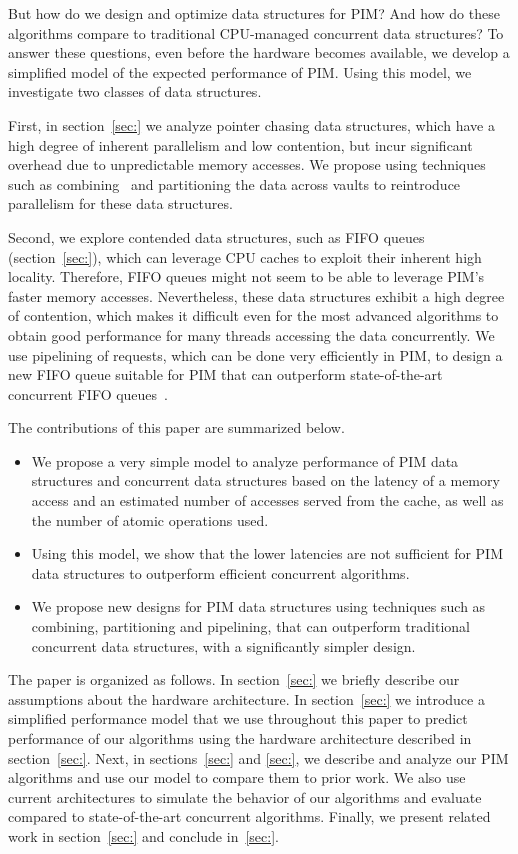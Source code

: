 But how do we design and optimize data structures for PIM? And how do these algorithms compare to traditional CPU-managed concurrent data structures? To answer these questions, even before the hardware becomes available, we develop a simplified model of the expected performance of PIM. Using this model, we 
investigate two classes of data structures. 

First, in section~\ref{sec:} we analyze pointer chasing data 
structures, which have a high degree of inherent parallelism and low contention, but incur significant 
overhead due to unpredictable memory accesses. 
We propose using techniques such as combining~\cite{} and partitioning 
the data across vaults to reintroduce parallelism for these data structures.

Second, we explore contended data structures, such as FIFO queues (section~\ref{sec:}),
 which can leverage CPU caches to exploit their inherent high locality. 
Therefore, FIFO queues might not seem to be able to leverage PIM's faster memory accesses. 
Nevertheless, these data structures exhibit a high degree of contention, which makes it difficult
even for the most advanced algorithms to obtain good performance for many threads accessing the data 
concurrently. We use pipelining of requests, which can be done very efficiently in PIM, to design a new FIFO queue suitable for PIM that can outperform state-of-the-art concurrent FIFO queues~\cite{}.

The contributions of this paper are summarized below.
\begin{itemize}
\item We propose a very simple model to analyze performance of PIM data structures and
concurrent data structures based on the latency of a memory access and an estimated number of 
accesses served from the cache, as well as the number of atomic operations used. 
\item Using this model, we show that the lower latencies are not sufficient for PIM data structures
to outperform efficient concurrent algorithms. 
 \item We propose new designs for PIM 
data structures using 
techniques such as combining, partitioning and pipelining, that can outperform traditional 
concurrent data structures, with a significantly simpler design. 
\end{itemize}


The paper is organized as follows. In section~\ref{sec:} we briefly describe our assumptions
about the hardware architecture. In section~\ref{sec:} we introduce a simplified performance model 
that we use throughout this paper to predict performance of our algorithms using the hardware 
architecture described in section~\ref{sec:}. Next, in sections~\ref{sec:} and \ref{sec:}, 
we describe and analyze our PIM algorithms 
and use our model to compare them to prior work. We also use current architectures to simulate 
the behavior of our algorithms and evaluate compared to state-of-the-art concurrent algorithms. 
Finally, we present related work in section~\ref{sec:} and conclude in~\ref{sec:}. 

